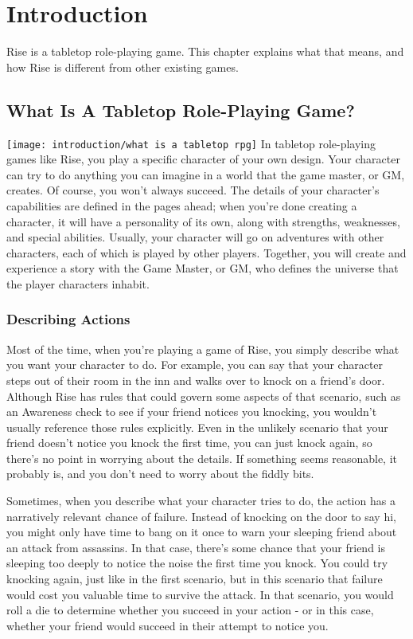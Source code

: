 \chapter{Introduction}

Rise is a tabletop role-playing game.
This chapter explains what that means, and how Rise is different from other existing games.

\section{What Is A Tabletop Role-Playing Game?}
  \texttt{[image: introduction/what is a tabletop rpg]}
  In tabletop role-playing games like Rise, you play a specific character of your own design.
  Your character can try to do anything you can imagine in a world that the game master, or GM, creates.
  Of course, you won't always succeed.
  The details of your character's capabilities are defined in the pages ahead; when you're done creating a character, it will have a personality of its own, along with strengths, weaknesses, and special abilities.
  Usually, your character will go on adventures with other characters, each of which is played by other players.
  Together, you will create and experience a story with the Game Master, or GM, who defines the universe that the player characters inhabit.

  \subsection{Describing Actions}
    Most of the time, when you're playing a game of Rise, you simply describe what you want your character to do.
    For example, you can say that your character steps out of their room in the inn and walks over to knock on a friend's door.
    Although Rise has rules that could govern some aspects of that scenario, such as an Awareness check to see if your friend notices you knocking, you wouldn't usually reference those rules explicitly.
    Even in the unlikely scenario that your friend doesn't notice you knock the first time, you can just knock again, so there's no point in worrying about the details.
    If something seems reasonable, it probably is, and you don't need to worry about the fiddly bits.

    Sometimes, when you describe what your character tries to do, the action has a narratively relevant chance of failure.
    Instead of knocking on the door to say hi, you might only have time to bang on it once to warn your sleeping friend about an attack from assassins.
    In that case, there's some chance that your friend is sleeping too deeply to notice the noise the first time you knock.
    You could try knocking again, just like in the first scenario, but in this scenario that failure would cost you valuable time to survive the attack.
    In that scenario, you would roll a die to determine whether you succeed in your action - or in this case, whether your friend would succeed in their attempt to notice you.

